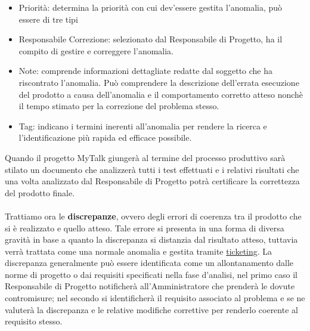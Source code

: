 \begin{itemize}
\item Priorità: determina la priorità con cui dev'essere gestita l'anomalia, può essere di tre tipi
\item Responsabile Correzione: selezionato dal Responsabile di Progetto, ha il compito di gestire e correggere l'anomalia.
\item Note: comprende informazioni dettagliate redatte dal soggetto che ha riscontrato l'anomalia. Può comprendere la descrizione dell'errata esecuzione del prodotto a causa dell'anomalia e il comportamento corretto atteso nonchè il tempo stimato per la correzione del problema stesso. 
\item Tag: indicano i termini inerenti all'anomalia per rendere la ricerca e l'identificazione più rapida ed efficace possibile.
\end{itemize}
Quando il progetto MyTalk giungerà al termine del processo produttivo sarà stilato un documento che analizzerà tutti i test effettuati e i relativi risultati che una volta analizzato dal Responsabile di Progetto potrà certificare la correttezza del prodotto finale.\\\\
Trattiamo ora le \textbf{discrepanze}, ovvero degli errori di coerenza tra il prodotto che si è realizzato e quello atteso. Tale errore si presenta in una forma di diversa gravità in base a quanto la discrepanza si distanzia dal risultato atteso, tuttavia verrà trattata come una normale anomalia e gestita tramite \underline{ticketing}.
La discrepanza generalmente può essere identificata come un allontanamento dalle norme di progetto o dai requisiti specificati nella fase d'analisi, nel primo caso il Responsabile di Progetto notificherà all'Amministratore che prenderà le dovute contromisure; nel secondo si identificherà il requisito associato al problema e se ne valuterà la discrepanza e le relative modifiche correttive per renderlo coerente al requisito stesso.

